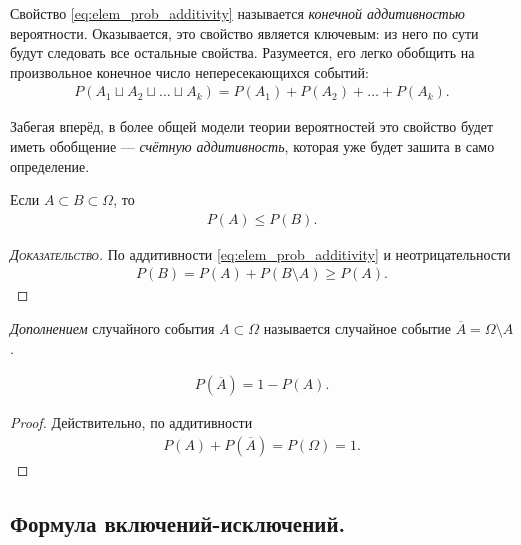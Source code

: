 \documentclass[../main.tex]{subfiles}
\begin{document}
Свойство \eqref{eq:elem_prob_additivity} называется \textit{конечной аддитивностью} вероятности. Оказывается, это свойство является ключевым: из него по сути будут следовать все остальные свойства. Разумеется, его легко обобщить на произвольное конечное число непересекающихся событий:
\begin{align*}
 P(A_1 \sqcup A_2 \sqcup \ldots \sqcup A_k) = P(A_1) + P(A_2) + \ldots + P(A_k).
\end{align*}

Забегая вперёд, в более общей модели теории вероятностей это свойство будет иметь обобщение --- \textit{счётную аддитивность}, которая уже будет зашита в само определение.

\begin{crly}
 Если $ A \subset B \subset \Omega $, то
 \begin{align*}
  P(A) \leqslant P(B).
 \end{align*}
\end{crly}
\begin{proof}[\normalfont\textsc{Доказательство}]
 По аддитивности \eqref{eq:elem_prob_additivity} и неотрицательности
 \begin{align*}
  P(B) = P(A) + P(B \setminus A) \geqslant P(A).
 \end{align*}
\end{proof}

\begin{df}
 \textit{Дополнением} случайного события $ A \subset \Omega $ называется случайное событие $\overline A = \Omega \setminus A$.
\end{df}
\begin{prop}
 \begin{align}
  \label{eq:prob_of_compl}
  P(\overline A) = 1 - P(A).
 \end{align}
\end{prop}
\begin{proof}
 Действительно, по аддитивности
 \begin{align*}
  P(A) + P(\overline A) = P(\Omega) = 1.
 \end{align*}
\end{proof}

\subsection{Формула включений-исключений.}
\end{document}
